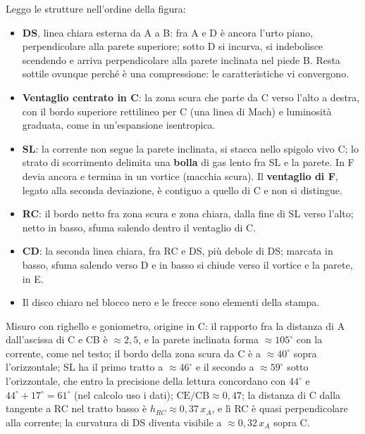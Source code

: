 
Leggo le strutture nell'ordine della figura:
\begin{itemize}
\item \textbf{DS}, linea chiara esterna da A a B: fra A e D è ancora l'urto piano, perpendicolare alla parete
  superiore; sotto D si incurva, si indebolisce scendendo e arriva perpendicolare alla parete inclinata nel piede B.
  Resta sottile ovunque perché è una compressione: le caratteristiche vi convergono.
\item \textbf{Ventaglio centrato in C}: la zona scura che parte da C verso l'alto a destra, con il bordo superiore
  rettilineo per C (una linea di Mach) e luminosità graduata, come in un'espansione isentropica.
\item \textbf{SL}: la corrente non segue la parete inclinata, si stacca nello spigolo vivo C; lo strato di
  scorrimento delimita una \textbf{bolla} di gas lento fra SL e la parete. In F devia ancora e termina in un vortice
  (macchia scura). Il \textbf{ventaglio di F}, legato alla seconda deviazione, è contiguo a quello di C e non si
  distingue.
\item \textbf{RC}: il bordo netto fra zona scura e zona chiara, dalla fine di SL verso l'alto; netto in basso, sfuma
  salendo dentro il ventaglio di C.
\item \textbf{CD}: la seconda linea chiara, fra RC e DS, più debole di DS; marcata in basso, sfuma salendo verso D e
  in basso si chiude verso il vortice e la parete, in E.
\item Il disco chiaro nel blocco nero e le frecce sono elementi della stampa.
\end{itemize}

Misuro con righello e goniometro, origine in C: il rapporto fra la distanza di A dall'ascissa di C e CB è
$\approx2{,}5$, e la parete inclinata forma $\approx105^\circ$ con la corrente, come nel testo; il bordo della zona
scura da C è a $\approx40^\circ$ sopra l'orizzontale; SL ha il primo tratto a $\approx46^\circ$ e il secondo a
$\approx59^\circ$ sotto l'orizzontale, che entro la precisione della lettura concordano con $44^\circ$ e
$44^\circ+17^\circ=61^\circ$ (nel calcolo uso i dati); $\mathrm{CE}/\mathrm{CB}\approx0{,}47$; la distanza di C dalla
tangente a RC nel tratto basso è $h_{RC}\approx0{,}37\,x_A$, e lì RC è quasi perpendicolare alla corrente; la
curvatura di DS diventa visibile a $\approx0{,}32\,x_A$ sopra C.

